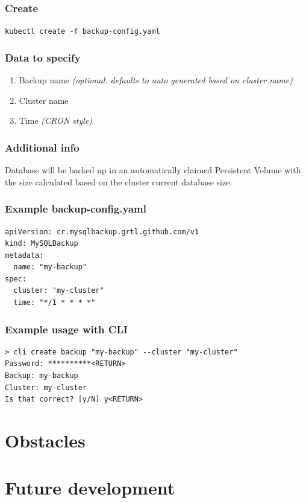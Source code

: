 \subsubsection{Create}
\texttt{kubectl create -f backup-config.yaml}

\subsubsection{Data to specify}
\begin{enumerate}
	\item Backup name \textit{(optional: defaults to auto generated based on cluster name)}
	\item Cluster name
	\item Time \textit{(CRON style)}
\end{enumerate}

\subsubsection{Additional info}
Database will be backed up in an automatically claimed Persistent Volume with the size
calculated based on the cluster current database size.

\subsubsection{Example \textbf{backup-config.yaml}}
\begin{lstlisting}[caption=backup-config.yaml,captionpos=b]
apiVersion: cr.mysqlbackup.grtl.github.com/v1
kind: MySQLBackup
metadata:
  name: "my-backup"
spec:
  cluster: "my-cluster"
  time: "*/1 * * * *"
\end{lstlisting}

\subsubsection{Example usage with CLI}
\begin{lstlisting}
> cli create backup "my-backup" --cluster "my-cluster"
Password: **********<RETURN>
Backup: my-backup
Cluster: my-cluster
Is that correct? [y/N] y<RETURN>
\end{lstlisting}

\section{Obstacles}

\section{Future development}
